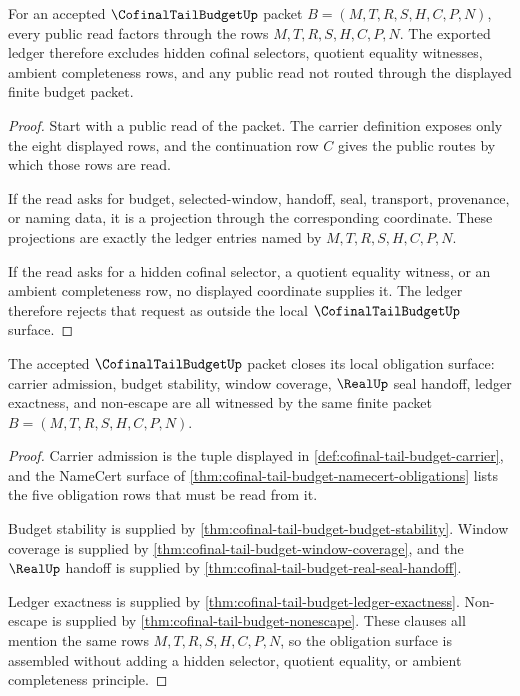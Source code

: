 \begin{theorem}
\label{thm:cofinal-tail-budget-ledger-exactness}
For an accepted $\CofinalTailBudgetUp$ packet $B=(M,T,R,S,H,C,P,N)$, every public read factors through the rows $M,T,R,S,H,C,P,N$. The exported ledger therefore excludes hidden cofinal selectors, quotient equality witnesses, ambient completeness rows, and any public read not routed through the displayed finite budget packet.
\end{theorem}
\begin{proof}
Start with a public read of the packet. The carrier definition exposes only the eight displayed rows, and the continuation row $C$ gives the public routes by which those rows are read.

If the read asks for budget, selected-window, handoff, seal, transport, provenance, or naming data, it is a projection through the corresponding coordinate. These projections are exactly the ledger entries named by $M,T,R,S,H,C,P,N$.

If the read asks for a hidden cofinal selector, a quotient equality witness, or an ambient completeness row, no displayed coordinate supplies it. The ledger therefore rejects that request as outside the local $\CofinalTailBudgetUp$ surface.
\end{proof}

\begin{theorem}
\label{thm:cofinal-tail-budget-obligation-closure}
The accepted $\CofinalTailBudgetUp$ packet closes its local obligation surface: carrier admission, budget stability, window coverage, $\RealUp$ seal handoff, ledger exactness, and non-escape are all witnessed by the same finite packet $B=(M,T,R,S,H,C,P,N)$.
\end{theorem}
\begin{proof}
Carrier admission is the tuple displayed in \autoref{def:cofinal-tail-budget-carrier}, and the NameCert surface of \autoref{thm:cofinal-tail-budget-namecert-obligations} lists the five obligation rows that must be read from it.

Budget stability is supplied by \autoref{thm:cofinal-tail-budget-budget-stability}. Window coverage is supplied by \autoref{thm:cofinal-tail-budget-window-coverage}, and the $\RealUp$ handoff is supplied by \autoref{thm:cofinal-tail-budget-real-seal-handoff}.

Ledger exactness is supplied by \autoref{thm:cofinal-tail-budget-ledger-exactness}. Non-escape is supplied by \autoref{thm:cofinal-tail-budget-nonescape}. These clauses all mention the same rows $M,T,R,S,H,C,P,N$, so the obligation surface is assembled without adding a hidden selector, quotient equality, or ambient completeness principle.
\end{proof}

